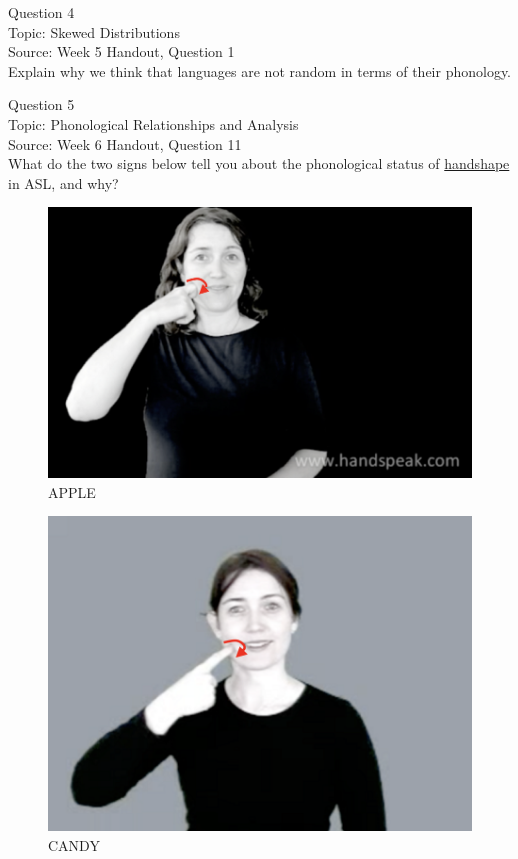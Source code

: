 \documentclass[12pt]{article}
\begin{document}
\newpage

{\large Question 4}\\

Topic: Skewed Distributions\\
Source: Week 5 Handout, Question 1\\

Explain why we think that languages are not random in terms of their phonology.\\


\newpage

{\large Question 5}\\

Topic: Phonological Relationships and Analysis\\
Source: Week 6 Handout, Question 11\\

What do the two signs below tell you about the phonological status of \underline{handshape} in ASL, and why?\\

\begin{figure}[H]
\includegraphics{../images/asl_apple.png}
\caption{APPLE}
\end{figure}
\begin{figure}[H]
\includegraphics{../images/asl_candy.png}
\caption{CANDY}
\end{figure}
\end{document}
